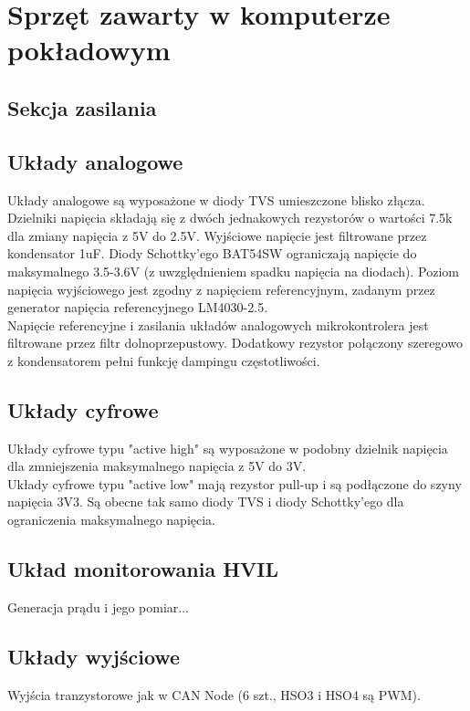 \chapter{Sprzęt zawarty w komputerze pokładowym}\label{chap:sprzet}
\section{Sekcja zasilania}

\section{Układy analogowe}
Układy analogowe są wyposażone w diody TVS umieszczone blisko złącza. Dzielniki napięcia składają się z dwóch jednakowych rezystorów o wartości 7.5k dla zmiany napięcia z 5V do 2.5V. Wyjściowe napięcie jest filtrowane przez kondensator 1uF. Diody Schottky'ego BAT54SW ograniczają napięcie do maksymalnego 3.5-3.6V (z uwzględnieniem spadku napięcia na diodach). Poziom napięcia wyjściowego jest zgodny z napięciem referencyjnym, zadanym przez generator napięcia referencyjnego LM4030-2.5. 
\\
Napięcie referencyjne i zasilania układów analogowych mikrokontrolera jest filtrowane przez filtr dolnoprzepustowy. Dodatkowy rezystor połączony szeregowo z kondensatorem pełni funkcję dampingu częstotliwości.
\section{Układy cyfrowe}
Układy cyfrowe typu "active high" są wyposażone w podobny dzielnik napięcia dla zmniejszenia maksymalnego napięcia z 5V do 3V.
\\
Układy cyfrowe typu "active low" mają rezystor pull-up i są podłączone do szyny napięcia 3V3. Są obecne tak samo diody TVS i diody Schottky'ego dla ograniczenia maksymalnego napięcia.
\section{Układ monitorowania HVIL}
Generacja prądu i jego pomiar...
\section{Układy wyjściowe}
Wyjścia tranzystorowe jak w CAN Node (6 szt., HSO3 i HSO4 są PWM).
